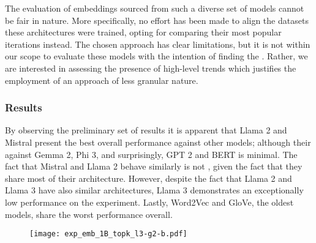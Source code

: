 
The evaluation of embeddings sourced from such a diverse set of models cannot be fair in nature.
More specifically, no effort has been made to align the datasets  these architectures were trained, opting for comparing their most popular iterations instead.
The chosen approach has clear limitations, but it is not within our scope to evaluate these models with the intention of finding the .
Rather, we are interested in assessing the presence of high-level trends which justifies the employment of an approach of less granular nature.

\subsubsection{Results}

\begin{figure}[t!]
    \centering
    \quad
    \caption{}
    \label{fig:exp_emb_1_A}
\end{figure}

By observing the preliminary set of results it is apparent that Llama 2 and Mistral present the best overall performance against other models; although their  against Gemma 2, Phi 3, and surprisingly, GPT 2 and BERT is minimal.
The fact that Mistral and Llama 2 behave similarly is not , given the fact that they share most of their architecture.
However, despite the fact that Llama 2 and Llama 3 have also similar architectures, Llama 3 demonstrates an exceptionally low performance on the experiment.
Lastly, Word2Vec and GloVe, the oldest models, share the worst performance overall.

\begin{figure}[t!]
    \centering
    \texttt{[image: exp\_emb\_1B\_topk\_l3-g2-b.pdf]}
    \caption{}
    \label{fig:exp_emb_1_B}
\end{figure}

